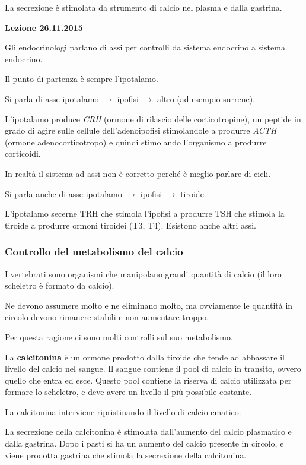 \documentclass[]{article}
\begin{document}
La secrezione è stimolata da strumento di calcio nel plasma e dalla
gastrina.

\textbf{Lezione 26.11.2015}

Gli endocrinologi parlano di assi per controlli da sistema endocrino a
sistema endocrino.

Il punto di partenza è sempre l'ipotalamo.

Si parla di asse ipotalamo \(\rightarrow\) ipofisi \(\rightarrow\) altro
(ad esempio surrene).

L'ipotalamo produce \emph{CRH} (ormone di rilascio delle
corticotropine), un peptide in grado di agire sulle cellule
dell'adenoipofisi stimolandole a produrre \emph{ACTH} (ormone
adenocorticotropo) e quindi stimolando l'organismo a produrre
corticoidi.

In realtà il sistema ad assi non è corretto perché è meglio parlare di
cicli.

Si parla anche di asse ipotalamo \(\rightarrow\) ipofisi \(\rightarrow\)
tiroide.

L'ipotalamo secerne TRH che stimola l'ipofisi a produrre TSH che stimola
la tiroide a produrre ormoni tiroidei (T3, T4). Esistono anche altri
assi.

\subsubsection{Controllo del metabolismo del
calcio}\label{controllo-del-metabolismo-del-calcio}

I vertebrati sono organismi che manipolano grandi quantità di calcio (il
loro scheletro è formato da calcio).

Ne devono assumere molto e ne eliminano molto, ma ovviamente le quantità
in circolo devono rimanere stabili e non aumentare troppo.

Per questa ragione ci sono molti controlli sul suo metabolismo.

La \textbf{calcitonina} è un ormone prodotto dalla tiroide che tende ad
abbassare il livello del calcio nel sangue. Il sangue contiene il pool
di calcio in transito, ovvero quello che entra ed esce. Questo pool
contiene la riserva di calcio utilizzata per formare lo scheletro, e
deve avere un livello il più possibile costante.

La calcitonina interviene ripristinando il livello di calcio ematico.

La secrezione della calcitonina è stimolata dall'aumento del calcio
plasmatico e dalla gastrina. Dopo i pasti si ha un aumento del calcio
presente in circolo, e viene prodotta gastrina che stimola la secrexione
della calcitonina.
\end{document}
